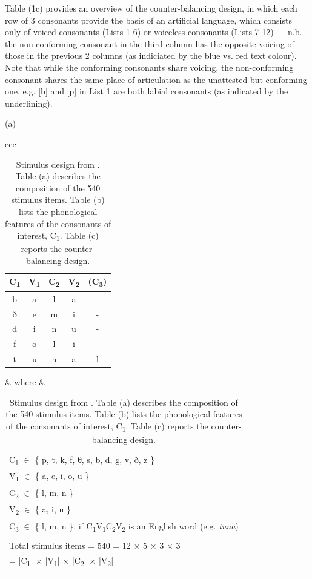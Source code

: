 \documentclass[letterpaper,11pt]{article}
\begin{document}
Table (1c) provides an overview of the counter-balancing design, in which each row of 3 consonants provide the basis of an artificial language, which consists only of voiced consonants (Lists 1-6) or voiceless consonants (Lists 7-12) --- n.b. the non-conforming consonant in the third column has the opposite voicing of those in the previous 2 columns (as indiciated by the blue vs. red text colour).
Note that while the conforming consonants share voicing, the non-conforming consonant shares the same place of articulation as the unattested but conforming one, e.g. [b] and [p] in List 1 are both labial consonants (as indicated by the underlining).

\begin{table}[h]
\centering
\caption{Stimulus design from \textcite{linzen2017rapid}. Table (a) describes the composition of the 540 stimulus items. Table (b) lists the phonological features of the consonants of interest, C\textsubscript{1}. Table (c) reports the counter-balancing design.}
\label{tab:stim}
(a)
\begin{tabular}{ccc}
{\renewcommand\arraystretch{1.5}\begin{tabular}{@{}ccccc@{}}
\\\toprule
C\textsubscript{1} & V\textsubscript{1} & C\textsubscript{2} & V\textsubscript{2} & (C\textsubscript{3}) \\ \midrule
b  & a  & l  & a  & -    \\
ð  & e  & m  & i  & -    \\
d  & i  & n  & u  & -    \\
f  & o  & l  & i  & -    \\
t  & u  & n  & a  & l    \\
\bottomrule
\end{tabular}} & where &
{\begin{tabular}{l}
C\textsubscript{1} $\in$ \{ p, t, k, f, θ, s, b, d, g, v, ð, z \} \\
V\textsubscript{1} $\in$ \{ a, e, i, o, u \} \\
C\textsubscript{2} $\in$ \{ l, m, n \} \\
V\textsubscript{2} $\in$ \{ a, i, u \} \\
C\textsubscript{3} $\in$ \{ l, m, n \}, if C\textsubscript{1}V\textsubscript{1}C\textsubscript{2}V\textsubscript{2} is an English word (e.g. \emph{tuna}) \\
\\
Total stimulus items = 540 = 12 $\times$ 5 $\times$ 3 $\times$ 3\\
\hphantom{Total stimulus items = 540} = |C\textsubscript{1}| $\times$ |V\textsubscript{1}| $\times$ |C\textsubscript{2}| $\times$ |V\textsubscript{2}| \\
    \hphantom{f}
\end{tabular}}
\end{tabular}


\end{table}
\end{document}
